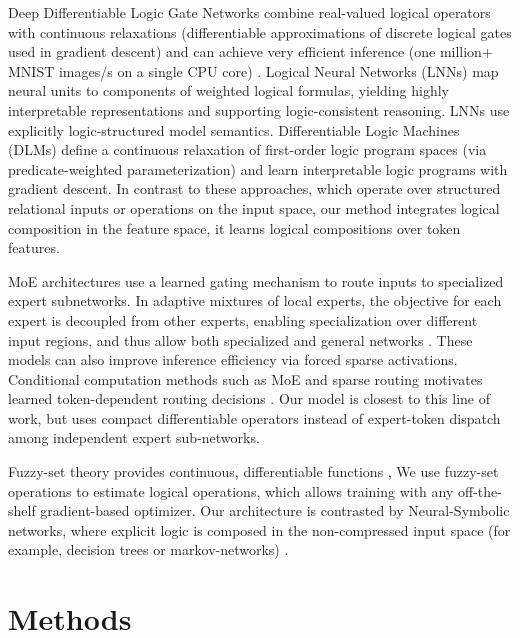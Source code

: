 \documentclass[10pt,twocolumn,letterpaper]{article}
\begin{document}
Deep Differentiable Logic Gate Networks combine real-valued logical operators
with continuous relaxations (differentiable approximations of discrete
logical gates used in gradient descent) and can achieve very efficient inference
(one million+ MNIST images/s on a single CPU core)
\cite{petersen2022deepdifferentiablelogicgate}.
Logical Neural Networks (LNNs) \cite{riegel2020logicalneuralnetworks}
map neural units to components of weighted logical formulas, yielding highly
interpretable representations and supporting logic-consistent reasoning.
LNNs use explicitly logic-structured model semantics.
Differentiable Logic Machines (DLMs) \cite{zimmer2023differentiablelogicmachines}
define a continuous relaxation of first-order logic program spaces (via
predicate-weighted parameterization) and learn interpretable logic programs
with gradient descent. In contrast to these approaches, which operate over
structured relational inputs or operations on the input space,
our method integrates logical composition in the feature space,
it learns logical compositions over token features.

MoE architectures use a learned gating mechanism to route
inputs to specialized expert subnetworks. In adaptive mixtures of local experts,
the objective for each expert is decoupled from other experts, enabling
specialization over different input regions, and thus allow both specialized and
general networks \cite{6797059}. These models can also improve inference efficiency
via forced sparse activations.
Conditional computation methods such as MoE and sparse
routing motivates learned token-dependent routing decisions
\cite{shazeer2017outrageouslylargeneuralnetworks,fedus2022switchtransformersscalingtrillion}.
Our model is closest to this line of work, but uses compact differentiable
operators instead of expert-token dispatch among independent expert sub-networks.

Fuzzy-set theory provides continuous, differentiable functions \cite{ZADEH1965338},
We use fuzzy-set operations to estimate logical operations,
which allows training with any off-the-shelf gradient-based optimizer.
Our architecture is contrasted by Neural-Symbolic networks,
where explicit logic is composed in the non-compressed input space
(for example, decision trees or markov-networks)
\cite{besold2017neuralsymboliclearningreasoningsurvey}.

\section{Methods}
\end{document}
